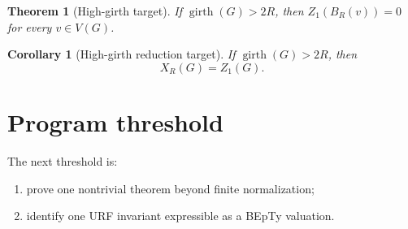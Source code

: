 \documentclass[11pt]{article}
\newtheorem{theorem}{Theorem}
\newtheorem{corollary}{Corollary}
\begin{document}
\begin{theorem}[High-girth target]
If \(\operatorname{girth}(G)>2R\), then \(Z_1(B_R(v))=0\) for every \(v\in V(G)\).
\end{theorem}

\begin{corollary}[High-girth reduction target]
If \(\operatorname{girth}(G)>2R\), then
\[
X_R(G)=Z_1(G).
\]
\end{corollary}

\section{Program threshold}

The next threshold is:
\begin{enumerate}
\item prove one nontrivial theorem beyond finite normalization;
\item identify one URF invariant expressible as a BEpTy valuation.
\end{enumerate}
\end{document}
